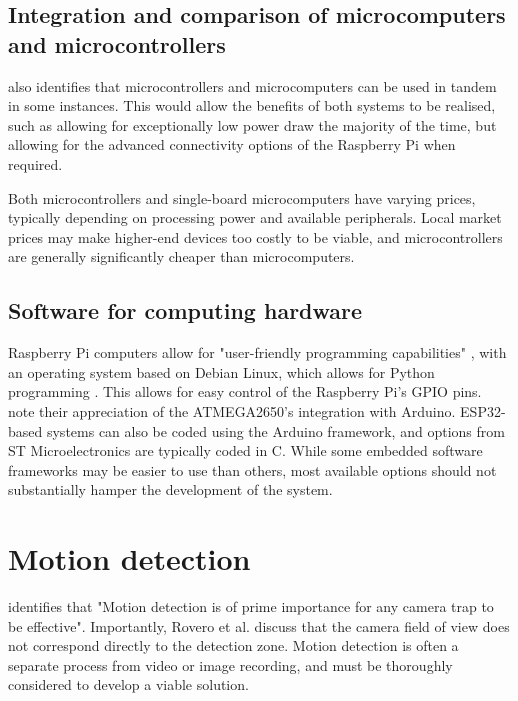\subsection{Integration and comparison of microcomputers and microcontrollers}

\cite{jolles2021broad-scale} also identifies that microcontrollers and microcomputers can be used in tandem in some instances. This would allow the benefits of both systems to be realised, such as allowing for exceptionally low power draw the majority of the time, but allowing for the advanced connectivity options of the Raspberry Pi when required.

Both microcontrollers and single-board microcomputers have varying prices, typically depending on processing power and available peripherals. Local market prices may make higher-end devices too costly to be viable, and microcontrollers are generally significantly cheaper than microcomputers.

\subsection{Software for computing hardware}

Raspberry Pi computers allow for "user-friendly programming capabilities" \cite{jolles2021broad-scale}, with an operating system based on Debian Linux, which allows for Python programming \cite{prinz2016a}. This allows for easy control of the Raspberry Pi's GPIO pins. \cite{camacho2017deployment} note their appreciation of the ATMEGA2650's integration with Arduino. ESP32-based systems can also be coded using the Arduino framework, and options from ST Microelectronics are typically coded in C. While some embedded software frameworks may be easier to use than others, most available options should not substantially hamper the development of the system.

\section{Motion detection}

\cite{meek2012user} identifies that "Motion detection is of prime importance for any camera trap to be effective". Importantly, Rovero et al. \cite{rovero2013which} discuss that the camera field of view does not correspond directly to the detection zone. Motion detection is often a separate process from video or image recording, and must be thoroughly considered to develop a viable solution.

